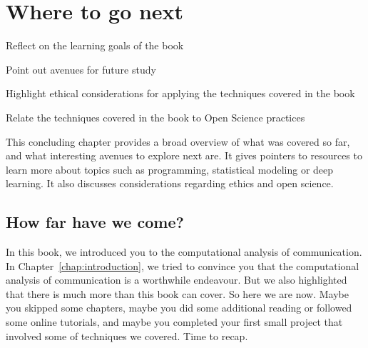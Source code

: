 \chapter{Where to go next}
\label{chap:wherenext}

\begin{abstract}{Abstract}
This chapter summarizes the main learning goals of the book, and outlines possible next steps. Special attention is payed to an ethical application of computational methods, as well as to the importance of open and transparent science.
\end{abstract}



\begin{objectives}
\item Reflect on the learning goals of the book
\item Point out avenues for future study
\item Highlight ethical considerations for applying the techniques covered in the book
\item Relate the techniques covered in the book to Open Science practices
\end{objectives}

\begin{feature}
This concluding chapter provides a broad overview of what was covered so far, and what interesting avenues to explore next are. It gives pointers to resources to learn more about topics such as programming, statistical modeling or deep learning. It also discusses considerations regarding ethics and open science.

\end{feature}



\section{How far have we come?}
In this book, we introduced you to the computational analysis of communication. In Chapter~\ref{chap:introduction}, we tried to convince you that the computational analysis of communication is a worthwhile endeavour. But we also highlighted that there is much more than this book can cover.
So here we are now. Maybe you skipped some chapters, maybe you did some additional reading or followed some online tutorials, and maybe you completed your first small project that involved some of techniques we covered. Time to recap.

